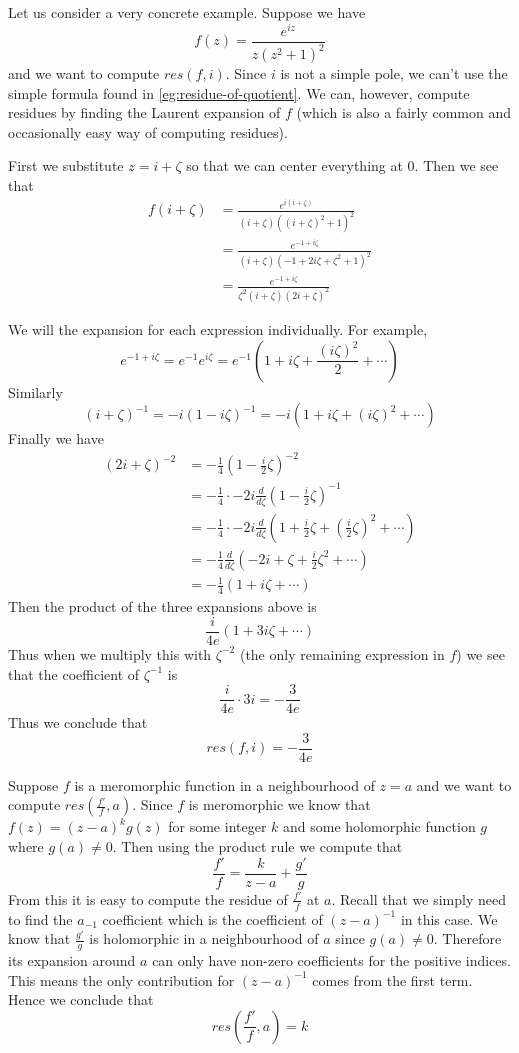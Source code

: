\begin{example}
Let us consider a very concrete example. Suppose we have
$$ f(z) = \frac{e^{iz}}{z(z^2 + 1)^2} $$
and we want to compute $res(f, i)$. Since $i$ is not a simple pole, we can't use the simple formula found in \autoref{eg:residue-of-quotient}. We can, however, compute residues by finding the Laurent expansion of $f$ (which is also a fairly common and occasionally easy way of computing residues).

First we substitute $z = i + \zeta$ so that we can center everything at 0.
Then we see that
\begin{align*}
    f(i + \zeta) &= \frac{e^{i(i + \zeta)}}{(i + \zeta)((i + \zeta)^2 + 1)^2}\\
    &= \frac{e^{-1 + i\zeta}}{(i + \zeta)(-1 + 2i\zeta + \zeta^2 + 1)^2}\\
    &= \frac{e^{-1 + i\zeta}}{\zeta^2(i + \zeta)(2i + \zeta)^2}
\end{align*}

We will the expansion for each expression individually. For example,
$$ e^{-1 + i\zeta} = e^{-1} e^{i \zeta} = e^{-1} \left(1 + i \zeta + \frac{(i\zeta)^2}{2} + \cdots \right) $$
Similarly
$$ (i + \zeta)^{-1} = -i(1 - i\zeta)^{-1} = -i(1 + i\zeta + (i\zeta)^2 + \cdots) $$
Finally we have 
\begin{align*}
    (2i + \zeta)^{-2} &= -\frac{1}{4} \left( 1 - \frac{i}{2} \zeta \right)^{-2}\\
    &= -\frac{1}{4} \cdot -2i \frac{d}{d\zeta} \left( 1 - \frac{i}{2} \zeta \right)^{-1}\\
    &= -\frac{1}{4} \cdot -2i \frac{d}{d\zeta} \left( 1 + \frac{i}{2} \zeta + \left( \frac{i}{2} \zeta \right)^2 + \cdots \right)\\
    &= -\frac{1}{4} \frac{d}{d\zeta}(-2i + \zeta  + \frac{i}{2}\zeta^2 + \cdots)\\
    &= -\frac{1}{4} (1 + i \zeta + \cdots )
\end{align*}
Then the product of the three expansions above is 
$$ \frac{i}{4e} (1 + 3i\zeta + \cdots ) $$
Thus when we multiply this with $\zeta^{-2}$ (the only remaining expression in $f$) we see that the coefficient of $\zeta^{-1}$ is
$$ \frac{i}{4e} \cdot 3i = - \frac{3}{4e} $$
Thus we conclude that
$$ res(f, i) = - \frac{3}{4e} $$
\end{example}
\begin{example}
Suppose $f$ is a meromorphic function in a neighbourhood of $z = a$ and we want to compute $res(\frac{f'}{f}, a)$. Since $f$ is meromorphic we know that $f(z) = (z - a)^k g(z)$ for some integer $k$ and some holomorphic function $g$ where $g(a) \neq 0$. Then using the product rule we compute that
$$ \frac{f'}{f} = \frac{k}{z - a} + \frac{g'}{g} $$
From this it is easy to compute the residue of $\frac{f'}{f}$ at $a$. Recall that we simply need to find the $a_{-1}$ coefficient which is the coefficient of $(z - a)^{-1}$ in this case. We know that $\frac{g'}{g}$ is holomorphic in a neighbourhood of $a$ since $g(a) \neq 0$. Therefore its expansion around $a$ can only have non-zero coefficients for the positive indices. This means the only contribution for $(z - a)^{-1}$ comes from the first term. Hence we conclude that
$$ res\left( \frac{f'}{f}, a \right) = k $$
\end{example}
